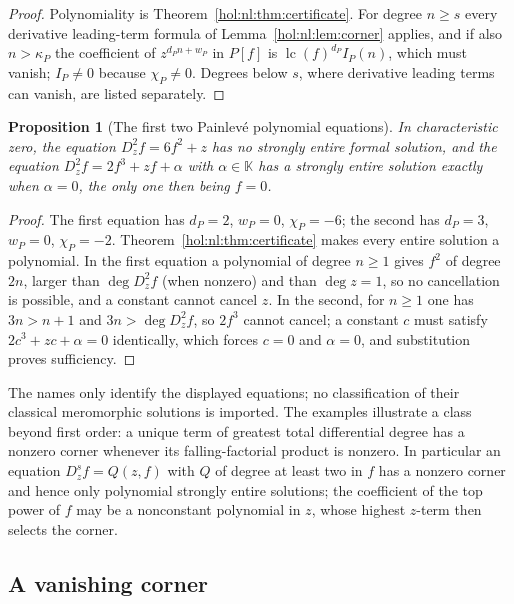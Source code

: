 \documentclass[11pt]{article}
\numberwithin{equation}{section}
\newtheorem{proposition}[theorem]{Proposition}
\theoremstyle{definition}
\theoremstyle{remark}
\newcommand{\lc}{\operatorname{lc}}
\newcommand{\KK}{\mathbb K}
\begin{document}
\begin{proof}
Polynomiality is Theorem~\ref{hol:nl:thm:certificate}. For degree $n\ge s$
every derivative leading-term formula of Lemma~\ref{hol:nl:lem:corner} applies,
and if also $n>\kappa_P$ the coefficient of $z^{d_Pn+w_P}$ in $P[f]$ is
$\lc(f)^{d_P}I_P(n)$, which must vanish; $I_P\ne0$ because $\chi_P\ne0$.
Degrees below $s$, where derivative leading terms can vanish, are listed
separately.
\end{proof}

\begin{proposition}[The first two Painlev\'e polynomial equations]
\label{hol:nl:prop:painleve}
In characteristic zero, the equation $D_z^2f=6f^2+z$ has no strongly entire
formal solution, and the equation $D_z^2f=2f^3+zf+\alpha$ with $\alpha\in\KK$
has a strongly entire solution exactly when $\alpha=0$, the only one then
being $f=0$.
\end{proposition}

\begin{proof}
The first equation has $d_P=2$, $w_P=0$, $\chi_P=-6$; the second has $d_P=3$,
$w_P=0$, $\chi_P=-2$. Theorem~\ref{hol:nl:thm:certificate} makes every entire
solution a polynomial. In the first equation a polynomial of degree $n\ge1$
gives $f^2$ of degree $2n$, larger than $\deg D_z^2f$ (when nonzero) and than
$\deg z=1$, so no cancellation is possible, and a constant cannot cancel $z$.
In the second, for $n\ge1$ one has $3n>n+1$ and $3n>\deg D_z^2f$, so $2f^3$
cannot cancel; a constant $c$ must satisfy $2c^3+zc+\alpha=0$ identically,
which forces $c=0$ and $\alpha=0$, and substitution proves sufficiency.
\end{proof}

The names only identify the displayed equations; no classification of their
classical meromorphic solutions is imported. The examples illustrate a class
beyond first order: a unique term of greatest total differential degree has a
nonzero corner whenever its falling-factorial product is nonzero. In
particular an equation $D_z^sf=Q(z,f)$ with $Q$ of degree at least two in $f$
has a nonzero corner and hence only polynomial strongly entire solutions; the
coefficient of the top power of $f$ may be a nonconstant polynomial in $z$,
whose highest $z$-term then selects the corner.

\subsection{A vanishing corner}\label{hol:nl:sub:vanishing}
\end{document}
